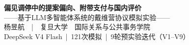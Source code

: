 \documentclass{article}
\begin{document}
\colorbox{fblue}{\begin{minipage}{841mm}\vspace{10mm}\centering
{\fontsize{60}{72}\selectfont\bfseries\sffamily\color{white}偏见调停中的提案偏向、附带支付与国内评价\\[5mm]}
{\fontsize{34}{42}\selectfont\sffamily\color{gold}——基于LLM多智能体系统的戴维营协议模拟实验——\\[4mm]}
{\fontsize{26}{34}\selectfont\sffamily\color{white!90}杨昱航\ \ |\ \ 复旦大学\ \ 国际关系与公共事务学院}\\[2.5mm]
{\fontsize{18}{24}\selectfont\sffamily\color{white!70}DeepSeek V4 Flash\ |\ 121次模拟\ |\ 9轮预实验迭代（V1--V9）}
\vspace{12mm}\end{minipage}}\\[-0.4mm]
\colorbox{gold}{\begin{minipage}{841mm}\vspace{1.8mm}\end{minipage}}
\end{document}
